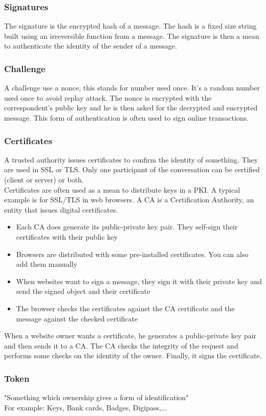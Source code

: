 \subsubsection{Signatures}
The signature is the encrypted hash of a message.
The hash is a fixed size string built using an irreversible function from a message.
The signature is then a mean to authenticate the identity of the sender of a message.
\subsubsection{Challenge}
A challenge use a nonce, this stands for number used once.
It's a random number used once to avoid replay attack.
The nonce is encrypted with the correspondent's public key and he is then asked for the decrypted and encrypted message.
This form of authentication is often used to sign online transactions.
\subsubsection{Certificates}
A trusted authority issues certificates to confirm the identity of something. They are used in SSL or TLS.
Only one participant of the conversation can be certified (client or server) or both.\\
Certificates are often used as a mean to distribute keys in a PKI. A typical example is for SSL/TLS in web browsers. A CA is a Certification Authority, an entity that issues digital certificates.
\begin{itemize}
\item Each CA does generate its public-private key pair. They self-sign their certificates with their public key
\item Browsers are distributed with some pre-installed certificates. You can also add them manually
\item When websites want to sign a message, they sign it with their private key and send the signed object and their certificate
\item The browser checks the certificates against the CA certificate and the message against the checked certificate
\end{itemize}
When a website owner wants a certificate, he generates a public-private key pair and then sends it to a CA.
The CA checks the integrity of the request and performs some checks on the identity of the owner. Finally, it signs the certificate.
\subsubsection{Token}
"Something which ownership gives a form of identification"\\
For example: Keys, Bank cards, Badges, Digipass,...
